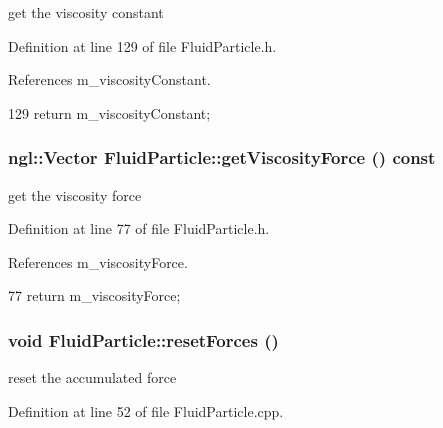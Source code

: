 get the viscosity constant 



Definition at line 129 of file FluidParticle.h.



References m\_\-viscosityConstant.




\begin{DoxyCode}
129 { return m_viscosityConstant; }
\end{DoxyCode}


\hypertarget{class_fluid_particle_a7c5bec4da4095e8ea26bd2de436b2cc2}{
\subsubsection[{getViscosityForce}]{\setlength{\rightskip}{0pt plus 5cm}ngl::Vector FluidParticle::getViscosityForce () const}}
\label{class_fluid_particle_a7c5bec4da4095e8ea26bd2de436b2cc2}


get the viscosity force 



Definition at line 77 of file FluidParticle.h.



References m\_\-viscosityForce.




\begin{DoxyCode}
77 { return m_viscosityForce; }
\end{DoxyCode}


\hypertarget{class_fluid_particle_acc7205ff8364fd974adbb5bc6d890520}{
\subsubsection[{resetForces}]{\setlength{\rightskip}{0pt plus 5cm}void FluidParticle::resetForces ()}}
\label{class_fluid_particle_acc7205ff8364fd974adbb5bc6d890520}


reset the accumulated force 



Definition at line 52 of file FluidParticle.cpp.



